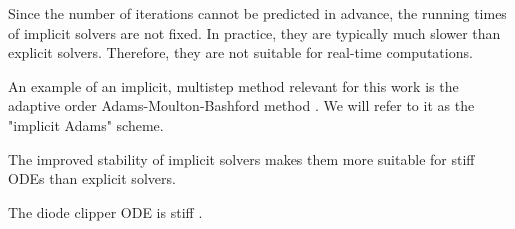 Since the number of iterations cannot be predicted in advance, the running times of implicit solvers are not fixed. In practice, they are typically much slower than explicit solvers. Therefore, they are not suitable for real-time computations.

An example of an implicit, multistep method relevant for this work is the adaptive order Adams-Moulton-Bashford method \cite{Karlsson2019}. We will refer to it as the "implicit Adams" scheme.

The improved stability of implicit solvers makes them more suitable for stiff \acp{ODE} than explicit solvers.

The diode clipper \ac{ODE} is stiff \cite{Parker2019}.
